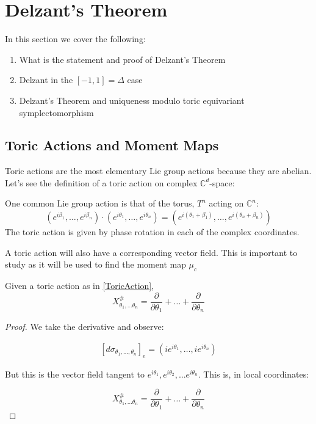 \section{Delzant's Theorem}

In this section we cover the following:
\begin{enumerate}
    \item What is the statement and proof of Delzant's Theorem
    \item Delzant in the $[-1, 1] = \Delta$ case
    \item Delzant's Theorem and uniqueness modulo toric equivariant symplectomorphism
\end{enumerate}
\subsection{Toric Actions and Moment Maps}

Toric actions are the most elementary Lie group actions because they are abelian. Let's see the definition of a toric action on complex $\mathbb{C}^{d}$-space:   
\begin{example}
\label{ToricAction}
One common Lie group action is that of the torus, $T^{n}$ acting on $\mathbb{C}^{n}$: 
\begin{equation}
(e^{i \beta_{1}}, \dots, e^{i \beta_{n}}) \cdot (e^{i \theta_{1}}, \dots, e^{i \theta_{n}}) = (e^{i (\theta_{1} + \beta_{1})}, \dots, e^{i (\theta_{n} + \beta_{n})})
\end{equation}
The toric action is given by phase rotation in each of the complex coordinates. 
\end{example}

\noindent A toric action will also have a corresponding vector field. This is important to study as it will be used to find the moment map $\mu_{c}$

\begin{lemma} 
Given a toric action as in \ref{ToricAction}, $$X^{\#}_{\theta_{1}, \dots \theta_{n}} = \frac{\partial}{\partial \theta_1} + \dots + \frac{\partial}{\partial \theta_n}$$
\end{lemma}

\begin{proof}
We take the derivative and observe:

\begin{align}
\left[ d \sigma_{\theta_{1}, \dots, \theta_{n}} \right]_{e} = (i e^{i \theta_{1}}, \dots, i e^{i \theta_{n}})
\end{align}

\noindent But this is the vector field tangent to $e^{i \theta_{1}}, e^{i \theta_{2}}, \dots e^{i \theta_{n}}$. This is, in local coordinates:

$$X^{\#}_{\theta_{1}, \dots \theta_{n}} = \frac{\partial}{\partial \theta_1} + \dots + \frac{\partial}{\partial \theta_n}$$
\end{proof}


